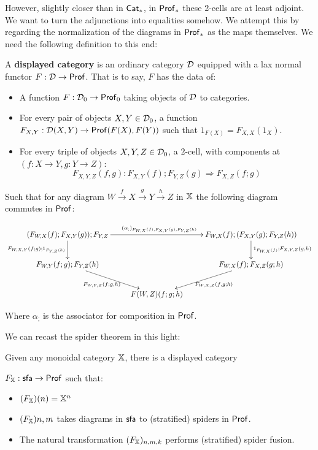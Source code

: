  However, slightly closer than in ${\sf Cat}_*$, in ${\sf Prof}_*$ these 2-cells are at least adjoint.  We want to turn the adjunctions into equalities somehow.  We attempt this by regarding the normalization of the diagrams in ${\sf Prof}_*$ as the maps themselves.  
We need the following definition to this end:

\begin{definition}
A {\bf displayed category} is an ordinary category $\mathcal{D}$ equipped with a lax normal functor $F:\mathcal{D}\to {\sf Prof}$.
That is to say, $F$ has the data of:

\begin{itemize}
\item A function $F:\mathcal{D}_0\to {\sf Prof}_0$ taking objects of $\mathcal{D}$ to categories.
\item For every pair of objects $X,Y \in \mathcal{D}_0$, a function $F_{X,Y}:\mathcal{D}(X,Y)\to {\sf Prof}(F(X),F(Y))$  such that $1_{F(X)}=F_{X,X}(1_X)$.
\item For every triple of objects $X,Y,Z \in \mathcal{D}_0$, a $2$-cell, with components at $(f:X\to Y,g:Y\to Z)$:
$$F_{X,Y,Z}(f,g):F_{X,Y}(f);F_{Y,Z}(g) \Rightarrow F_{X,Z}(f;g)$$
\end{itemize}

Such that for any diagram $W\xrightarrow{f} X \xrightarrow{g} Y \xrightarrow{h} Z$ in $\mathbb{X}$ the following diagram commutes in ${\sf Prof}$:


$$
\xymatrix{
(F_{W,X}(f);F_{X,Y}(g));F_{Y,Z} \ar[d]_{F_{W,X,Y}(f;g);1_{F_{Y,Z}(h)}} \ar[rr]^{(\alpha_;)_{F_{W,X}(f),F_{X,Y}(g),F_{Y,Z}(h)}}
  & & F_{W,X}(f);(F_{X,Y}(g);F_{Y,Z}(h)) \ar[d]^{1_{F_{W,X}(f)};F_{X,Y,Z}(g,h)}\\
F_{W,Y}(f;g);F_{Y,Z}(h) \ar[dr]_{F_{W,Y,Z}(f;g,h) \ \ }
  && F_{W,X}(f);F_{X,Z}(g;h) \ar[dl]^{\ \ F_{W,X,Z}(f,g;h)}\\
  & F(W,Z)(f;g;h)
}
$$

Where $\alpha_;$ is the associator for composition in ${\sf Prof}$.
\end{definition}

We can recast the spider theorem in this light:

\begin{lemma}
Given any monoidal category $\mathbb{X}$, there is a displayed category

$F_{\mathbb{X}}:{\sf sfa}\to {\sf Prof}$ such that:
\begin{itemize}
\item $(F_{\mathbb{X}})(n) = \mathbb{X}^n$
\item $(F_{\mathbb{X}}){n,m}$ takes diagrams in ${\sf sfa}$ to (stratified) spiders in ${\sf Prof}$.
\item The natural transformation $(F_{\mathbb{X}})_{n,m,k}$ performs (stratified) spider fusion.
\end{itemize}


\end{lemma}


